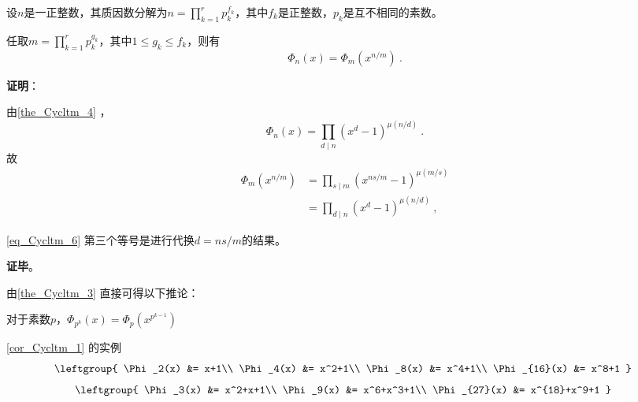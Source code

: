 \begin{theorem}{}\label{the_Cycltm_3}
设$n$是一正整数，其质因数分解为$n=\prod_{k=1}^r p_k^{f_k}$，其中$f_k$是正整数，$p_k$是互不相同的素数。

任取$m=\prod_{k=1}^r p_k^{g_k}$，其中$1\leq g_k\leq f_k$，则有
\begin{equation}
\Phi_n(x) = \Phi_m(x^{n/m})~.
\end{equation}
\end{theorem}

\textbf{证明}：

由\autoref{the_Cycltm_4} ，
\begin{equation}
\Phi_n(x) = \prod_{d\mid n}(x^d-1)^{\mu(n/d)}~.
\end{equation}
故
\begin{equation}\label{eq_Cycltm_6}
\begin{aligned}
\Phi_m(x^{n/m}) &= \prod_{s\mid m}(x^{ns/m}-1)^{\mu(m/s)}\\
&=\prod_{d\mid n}(x^{d}-1)^{\mu(n/d)}~,
\end{aligned}
\end{equation}

\autoref{eq_Cycltm_6} 第三个等号是进行代换$d=ns/m$的结果。


\textbf{证毕}。








由\autoref{the_Cycltm_3} 直接可得以下推论：

\begin{corollary}{}\label{cor_Cycltm_1}
对于素数$p$，$\Phi_{p^k}(x) = \Phi_p(x^{p^{k-1}})$
\end{corollary}




\begin{example}{\autoref{cor_Cycltm_1}  的实例}
\begin{equation}
\leftgroup{
    \Phi_2(x) &= x+1\\
    \Phi_4(x) &= x^2+1\\
    \Phi_8(x) &= x^4+1\\
    \Phi_{16}(x) &= x^8+1
}~
\end{equation}
\begin{equation}
\leftgroup{
    \Phi_3(x) &= x^2+x+1\\
    \Phi_9(x) &= x^6+x^3+1\\
    \Phi_{27}(x) &= x^{18}+x^9+1
}~
\end{equation}
\end{example}




